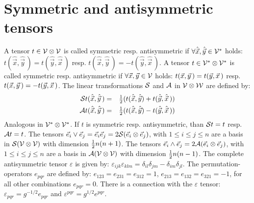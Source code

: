\documentclass[twoside]{report}
\begin{document}
\section{Symmetric and antisymmetric tensors}
A tensor $t\in{\cal V\otimes V}$ is called symmetric resp. antisymmetric if
$\forall\hat{\vec{x}},\hat{\vec{y}}\in{\cal V^*}$ holds:
$t(\hat{\vec{x}},\hat{\vec{y}}\,)=t(\hat{\vec{y}},\hat{\vec{x}}\,)$ resp.
$t(\hat{\vec{x}},\hat{\vec{y}}\,)=-t(\hat{\vec{y}},\hat{\vec{x}}\,)$.
\npar
A tensor $t\in{\cal V^*\otimes V^*}$ is called symmetric resp. antisymmetric
if $\forall\vec{x},\vec{y}\in{\cal V}$ holds:
$t(\vec{x},\vec{y}\,)=t(\vec{y},\vec{x}\,)$ resp.
$t(\vec{x},\vec{y}\,)=-t(\vec{y},\vec{x}\,)$. The linear transformations
$\cal S$ and $\cal A$ in $\cal V\otimes W$ are defined by:
\begin{eqnarray*}
{\cal S}t(\hat{\vec{x}},\hat{\vec{y}}\,)&=&\mbox{$\frac{1}{2}$}(t(\hat{\vec{x}},\hat{\vec{y}})+t(\hat{\vec{y}},\hat{\vec{x}}\,))\\
{\cal A}t(\hat{\vec{x}},\hat{\vec{y}}\,)&=&\mbox{$\frac{1}{2}$}(t(\hat{\vec{x}},\hat{\vec{y}})-t(\hat{\vec{y}},\hat{\vec{x}}\,))
\end{eqnarray*}
Analogous in $\cal V^*\otimes V^*$. If $t$ is symmetric resp. antisymmetric,
than ${\cal S}t=t$ resp. ${\cal A}t=t$.
\npar
The tensors $\vec{e}_i\vee\vec{e}_j=\vec{e}_i\vec{e}_j=2{\cal S}(\vec{e}_i\otimes\vec{e}_j)$,
with $1\leq i\leq j\leq n$ are a basis in $\cal S(V\otimes V)$ with dimension
$\mbox{$\frac{1}{2}$} n(n+1)$.
\npar
The tensors $\vec{e}_i\wedge\vec{e}_j=2{\cal A}(\vec{e}_i\otimes\vec{e}_j)$,
with $1\leq i\leq j\leq n$ are a basis in $\cal A(V\otimes V)$ with dimension
$\mbox{$\frac{1}{2}$} n(n-1)$.
\npar
The complete antisymmetric tensor $\varepsilon$ is given by:
$\varepsilon_{ijk}\varepsilon_{klm}=\delta_{il}\delta_{jm}-\delta_{im}\delta_{jl}$.
\npar
The permutation-operators $e_{pqr}$ are defined by:
$e_{123}=e_{231}=e_{312}=1$, $e_{213}=e_{132}=e_{321}=-1$, for all other
combinations $e_{pqr}=0$. There is a connection with the $\varepsilon$ tensor:
$\varepsilon_{pqr}=g^{-1/2}e_{pqr}$ and $\varepsilon^{pqr}=g^{1/2}e^{pqr}$.
\end{document}
